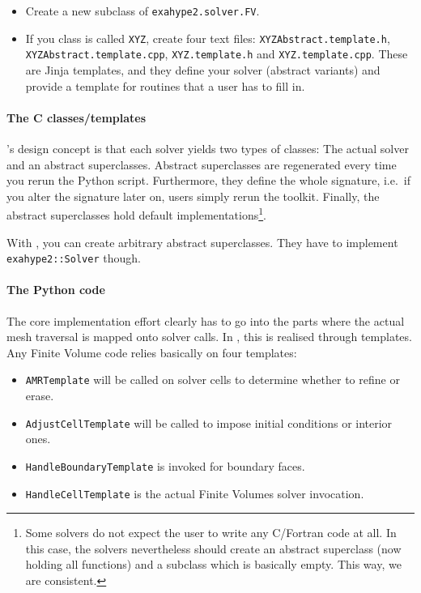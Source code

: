 \begin{itemize}
  \item Create a new subclass of \texttt{exahype2.solver.FV}.
  \item If you class is called \texttt{XYZ}, create four text files:
  \texttt{XYZAbstract.template.h}, \linebreak \texttt{XYZAbstract.template.cpp},
  \texttt{XYZ.template.h} and \texttt{XYZ.template.cpp}. These are Jinja
  templates, and they define your solver (abstract variants) and provide a
  template for routines that a user has to fill in.
\end{itemize}


\paragraph{The C classes/templates}

\ExaHyPE's design concept is that each solver yields two types of classes:
The actual solver and an abstract superclasses. 
Abstract superclasses are regenerated every time you rerun the Python script.
Furthermore, they define the whole signature, i.e.~if you alter the signature
later on, users simply rerun the toolkit. 
Finally, the abstract superclasses hold default implementations\footnote{Some
solvers do not expect the user to write any C/Fortran code at all. In this
case, the solvers nevertheless should create an abstract superclass (now
holding all functions) and a subclass which is basically empty. This way, we
are consistent.}.


With \Peano, you can create arbitrary abstract superclasses. 
They have to implement \texttt{exahype2::Solver} though.


\paragraph{The Python code}


The core implementation effort clearly has to go into the parts where the actual
mesh traversal is mapped onto solver calls.
In \ExaHyPE, this is realised through templates. 
Any Finite Volume code relies basically on four templates:

\begin{itemize}
  \item \texttt{AMRTemplate} will be called on solver cells to determine whether
  to refine or erase.
  \item \texttt{AdjustCellTemplate} will be called to impose initial conditions
  or interior ones.
  \item \texttt{HandleBoundaryTemplate} is invoked for boundary faces.
  \item \texttt{HandleCellTemplate} is the actual Finite Volumes solver
  invocation.
\end{itemize}



